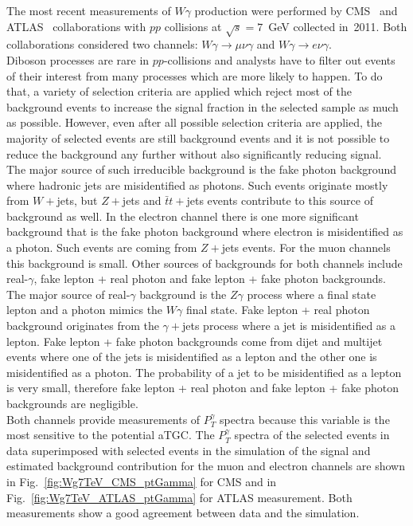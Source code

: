 The most recent measurements of $W\gamma$ production were performed by CMS~\cite{ref_7TeV_CMS} and ATLAS~\cite{ref_7TeV_ATLAS} collaborations with $pp$ collisions at $\sqrt{s}=7$~GeV collected in~2011. Both collaborations considered two channels: $W\gamma\rightarrow\mu\nu\gamma$ and $W\gamma\rightarrow e\nu\gamma$.\\


Diboson processes are rare in $pp$-collisions and analysts have to filter out events of their interest from many processes which are more likely to happen. To do that, a variety of selection criteria are applied which reject most of the background events to increase the signal fraction in the selected sample as much as possible. However, even after all possible selection criteria are applied, the majority of selected events are still background events and it is not possible to reduce the background any further without also significantly reducing signal.\\

The major source of such irreducible background is the fake photon background where hadronic jets are misidentified as photons. Such events originate mostly from $W+$jets, but $Z+$jets and $\bar{t}t+$jets events contribute to this source of background as well. In the electron channel there is one more significant background that is the fake photon background where electron is misidentified as a photon.  Such events are coming from $Z+$jets events. For the muon channels this background is small. Other sources of backgrounds for both channels include real-$\gamma$, fake lepton + real photon and fake lepton + fake photon backgrounds. The major source of real-$\gamma$ background is the $Z\gamma$ process where a final state lepton and a photon mimics the $W\gamma$ final state. Fake lepton + real photon background originates from the $\gamma+$jets process where a jet is misidentified as a lepton. Fake lepton + fake photon backgrounds come from dijet and multijet events where one of the jets is misidentified as a lepton and the other one is misidentified as a photon. The probability of a jet to be misidentified as a lepton is very small, therefore fake lepton + real photon and fake lepton + fake photon backgrounds are negligible.\\

Both channels provide measurements of $P_T^\gamma$ spectra because this variable is the most sensitive to the potential aTGC. The $P_T^\gamma$ spectra of the selected events in data superimposed with selected events in the simulation of the signal and estimated background contribution for the muon and electron channels are shown in Fig.~\ref{fig:Wg7TeV_CMS_ptGamma} for CMS and in Fig.~\ref{fig:Wg7TeV_ATLAS_ptGamma} for ATLAS measurement. Both measurements show a good agreement between data and the simulation.\\

